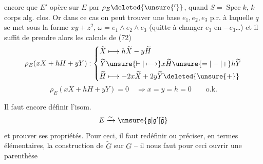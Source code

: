 encore que $E'$ opère \uline{} sur $E$ par $\rho_E\deleted{\unsure{'}}$, quand  $S=\operatorname{Spec}k$, $k$ corps alg. clos. Or dans ce cas on peut trouver une base $e_1,e_2,e_3$ p.r. à laquelle $q$ se met sous la forme $xy+z^2$, $\omega=e_1\wedge e_2\wedge e_3$ (quitte  à changer $e_3$ en $-e_3$\ldots) et il suffit de prendre alors les calculs de (72)
\[
\rho_E(xX+hH+yY):
\left\{\begin{aligned}
\widetilde X&\longmapsto h\widetilde X-y\widetilde H\\
\widetilde Y&\unsure{\vdash|\longmapsto} x\widetilde H\unsure{=|-|+}h\widetilde Y\\
\widetilde H&\longmapsto-2x\widetilde X+2y\widetilde Y\deleted{\unsure{+}}
\end{aligned}\right.
\]
\[
\rho_E(xX+hH+yY)=0\quad\Longrightarrow x=y=h=0\qquad\text{o.k.}
\]

Il faut encore définir l'isom.
\[
 E\xrightarrow{\sim}\unsure{\mathfrak g|\mathfrak g'|\widetilde{\mathfrak g}}
\]
et prouver ses propriétés. Pour ceci, il faut redéfinir ou préciser, en termes élémentaires, la construction de $\widetilde G$ sur $G$ -- il nous faut pour ceci ouvrir une parenthèse
